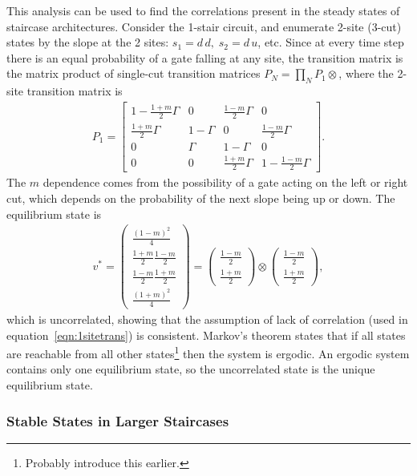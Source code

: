This analysis can be used to find the correlations present in the steady states of staircase architectures. Consider the 1-stair circuit, and enumerate 2-site (3-cut) states by the slope at the 2 sites: $s_1 = d\,d,\; s_2 = d\,u$, etc. Since at every time step there is an equal probability of a gate falling at any site, the transition matrix is the matrix product of single-cut transition matrices $P_{N} = \prod_NP_{1}\otimes$, where the 2-site transition matrix is 
\begin{align}
P_1 = \begin{bmatrix}
1-\frac{1+m}{2}\Gamma & 0      & \frac{1-m}{2}\Gamma & 0\\
\frac{1+m}{2}\Gamma & 1-\Gamma & 0                   & \frac{1-m}{2}\Gamma\\
0                   & \Gamma   & 1-\Gamma            & 0\\
0                   & 0        & \frac{1+m}{2}\Gamma & 1 - \frac{1-m}{2}\Gamma
\end{bmatrix}. \label{eqn:1sitetrans}
\end{align}
The $m$ dependence comes from the possibility of a gate acting on the left or right cut, which depends on the probability of the next slope being up or down.
The equilibrium state is
\begin{align}
v^* = \begin{pmatrix}
\frac{(1-m)^2}{4} \\ 
\frac{1+m}{2}\frac{1-m}{2} \\
\frac{1-m}{2}\frac{1+m}{2} \\
\frac{(1+m)^2}{4}
\end{pmatrix} = \begin{pmatrix}
\frac{1-m}{2} \\ \frac{1+m}{2}
\end{pmatrix} \otimes \begin{pmatrix}
\frac{1-m}{2} \\ \frac{1+m}{2}
\end{pmatrix},
\end{align}
which is uncorrelated, showing that the assumption of lack of correlation (used in equation~\ref{eqn:1sitetrans}) is consistent. Markov's theorem states that if all states are reachable from all other states\footnote{Probably introduce this earlier.} then the system is ergodic. An ergodic system contains only one equilibrium state, so the uncorrelated state is the unique equilibrium state.

\subsubsection{Stable States in Larger Staircases}  \label{subsub:stairstate}

